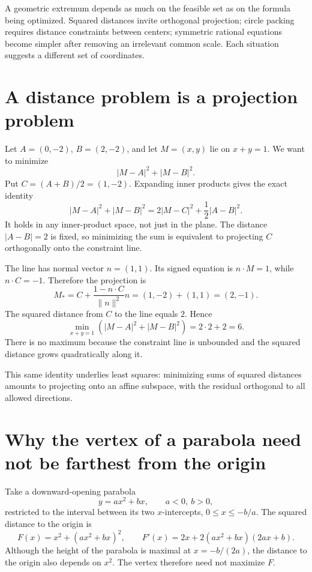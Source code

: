 
A geometric extremum depends as much on the feasible set as on the formula being optimized. Squared distances invite orthogonal projection; circle packing requires distance constraints between centers; symmetric rational equations become simpler after removing an irrelevant common scale. Each situation suggests a different set of coordinates.

\section{A distance problem is a projection problem}

Let \(A=(0,-2)\), \(B=(2,-2)\), and let \(M=(x,y)\) lie on \(x+y=1\). We want to minimize
\[
 |M-A|^2+|M-B|^2.
\]
Put \(C=(A+B)/2=(1,-2)\). Expanding inner products gives the exact identity
\[
 \boxed{|M-A|^2+|M-B|^2
       =2|M-C|^2+\frac12|A-B|^2.}
\]
It holds in any inner-product space, not just in the plane. The distance \(|A-B|=2\) is fixed, so minimizing the sum is equivalent to projecting \(C\) orthogonally onto the constraint line.

The line has normal vector \(n=(1,1)\). Its signed equation is \(n\cdot M=1\), while \(n\cdot C=-1\). Therefore the projection is
\[
 M_*=C+\frac{1-n\cdot C}{\|n\|^2}n
 =(1,-2)+(1,1)=(2,-1).
\]
The squared distance from \(C\) to the line equals \(2\). Hence
\[
 \min_{x+y=1}(|M-A|^2+|M-B|^2)=2\cdot2+2=6.
\]
There is no maximum because the constraint line is unbounded and the squared distance grows quadratically along it.

This same identity underlies least squares: minimizing sums of squared distances amounts to projecting onto an affine subspace, with the residual orthogonal to all allowed directions.

\section{Why the vertex of a parabola need not be farthest from the origin}

Take a downward-opening parabola
\[
 y=ax^2+bx,\qquad a<0,\ b>0,
\]
restricted to the interval between its two \(x\)-intercepts, \(0\le x\le-b/a\). The squared distance to the origin is
\[
 F(x)=x^2+(ax^2+bx)^2,
 \qquad F'(x)=2x+2(ax^2+bx)(2ax+b).
\]
Although the height of the parabola is maximal at \(x=-b/(2a)\), the distance to the origin also depends on \(x^2\). The vertex therefore need not maximize \(F\).

